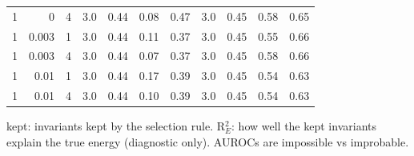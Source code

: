 \begin{table}[t]
\begin{tabular}{rrr|cccc|cccc}
1 & 0 & 4 & 3.0 & 0.44 & 0.08 & 0.47 & 3.0 & 0.45 & 0.58 & 0.65\\
1 & 0.003 & 1 & 3.0 & 0.44 & 0.11 & 0.37 & 3.0 & 0.45 & 0.55 & 0.66\\
1 & 0.003 & 4 & 3.0 & 0.44 & 0.07 & 0.37 & 3.0 & 0.45 & 0.58 & 0.66\\
1 & 0.01 & 1 & 3.0 & 0.44 & 0.17 & 0.39 & 3.0 & 0.45 & 0.54 & 0.63\\
1 & 0.01 & 4 & 3.0 & 0.44 & 0.10 & 0.39 & 3.0 & 0.45 & 0.54 & 0.63\\
\bottomrule\end{tabular}
\par\smallskip\footnotesize kept: invariants kept by the selection rule. R$^2_E$: how well the kept invariants explain the true energy (diagnostic only). AUROCs are impossible vs improbable.
\end{table}
